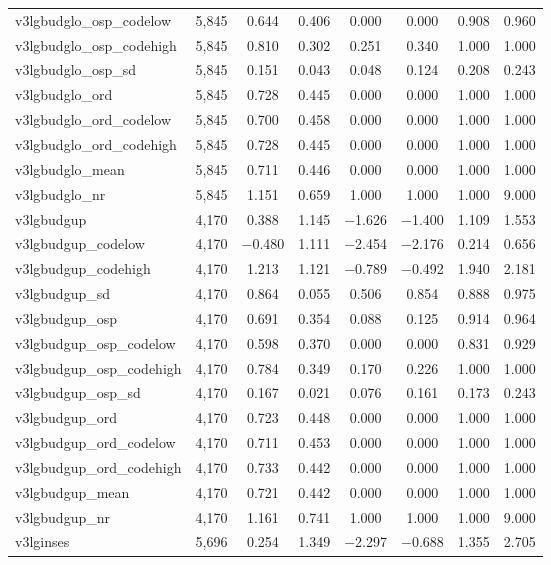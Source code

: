 \begin{table}[!htbp]
\begin{tabular}{@{\extracolsep{5pt}}lccccccc}
v3lgbudglo\_osp\_codelow & 5,845 & 0.644 & 0.406 & 0.000 & 0.000 & 0.908 & 0.960 \\ 
v3lgbudglo\_osp\_codehigh & 5,845 & 0.810 & 0.302 & 0.251 & 0.340 & 1.000 & 1.000 \\ 
v3lgbudglo\_osp\_sd & 5,845 & 0.151 & 0.043 & 0.048 & 0.124 & 0.208 & 0.243 \\ 
v3lgbudglo\_ord & 5,845 & 0.728 & 0.445 & 0.000 & 0.000 & 1.000 & 1.000 \\ 
v3lgbudglo\_ord\_codelow & 5,845 & 0.700 & 0.458 & 0.000 & 0.000 & 1.000 & 1.000 \\ 
v3lgbudglo\_ord\_codehigh & 5,845 & 0.728 & 0.445 & 0.000 & 0.000 & 1.000 & 1.000 \\ 
v3lgbudglo\_mean & 5,845 & 0.711 & 0.446 & 0.000 & 0.000 & 1.000 & 1.000 \\ 
v3lgbudglo\_nr & 5,845 & 1.151 & 0.659 & 1.000 & 1.000 & 1.000 & 9.000 \\ 
v3lgbudgup & 4,170 & 0.388 & 1.145 & $-$1.626 & $-$1.400 & 1.109 & 1.553 \\ 
v3lgbudgup\_codelow & 4,170 & $-$0.480 & 1.111 & $-$2.454 & $-$2.176 & 0.214 & 0.656 \\ 
v3lgbudgup\_codehigh & 4,170 & 1.213 & 1.121 & $-$0.789 & $-$0.492 & 1.940 & 2.181 \\ 
v3lgbudgup\_sd & 4,170 & 0.864 & 0.055 & 0.506 & 0.854 & 0.888 & 0.975 \\ 
v3lgbudgup\_osp & 4,170 & 0.691 & 0.354 & 0.088 & 0.125 & 0.914 & 0.964 \\ 
v3lgbudgup\_osp\_codelow & 4,170 & 0.598 & 0.370 & 0.000 & 0.000 & 0.831 & 0.929 \\ 
v3lgbudgup\_osp\_codehigh & 4,170 & 0.784 & 0.349 & 0.170 & 0.226 & 1.000 & 1.000 \\ 
v3lgbudgup\_osp\_sd & 4,170 & 0.167 & 0.021 & 0.076 & 0.161 & 0.173 & 0.243 \\ 
v3lgbudgup\_ord & 4,170 & 0.723 & 0.448 & 0.000 & 0.000 & 1.000 & 1.000 \\ 
v3lgbudgup\_ord\_codelow & 4,170 & 0.711 & 0.453 & 0.000 & 0.000 & 1.000 & 1.000 \\ 
v3lgbudgup\_ord\_codehigh & 4,170 & 0.733 & 0.442 & 0.000 & 0.000 & 1.000 & 1.000 \\ 
v3lgbudgup\_mean & 4,170 & 0.721 & 0.442 & 0.000 & 0.000 & 1.000 & 1.000 \\ 
v3lgbudgup\_nr & 4,170 & 1.161 & 0.741 & 1.000 & 1.000 & 1.000 & 9.000 \\ 
v3lginses & 5,696 & 0.254 & 1.349 & $-$2.297 & $-$0.688 & 1.355 & 2.705 \\ 

\end{tabular}
\end{table}
